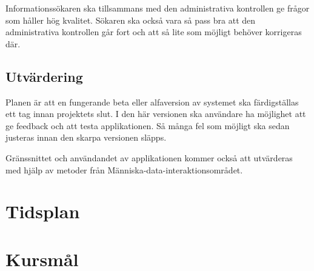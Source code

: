 \documentclass[12pt,a4paper]{article}
\begin{document}
Informationssökaren ska tillsammans med den administrativa kontrollen ge frågor som håller hög kvalitet. Sökaren ska också vara så pass bra att den administrativa kontrollen går fort och att så lite som möjligt behöver korrigeras där.
\subsection{Utvärdering}
Planen är att en fungerande beta eller alfaversion av systemet ska färdigställas ett tag innan projektets slut. I den här versionen ska användare ha möjlighet att ge feedback och att testa applikationen. Så många fel som möjligt ska sedan justeras innan den skarpa versionen släpps.

Gränssnittet och användandet av applikationen kommer också att utvärderas med hjälp av metoder från Människa-data-interaktionsområdet.
\appendix
\section{Tidsplan}
\section{Kursmål}
\end{document}

